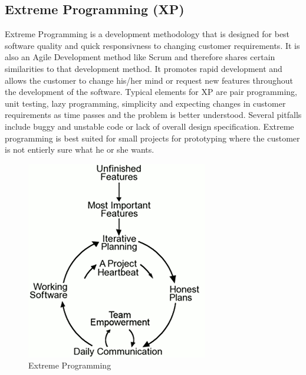 \subsection{Extreme Programming (XP)}
Extreme Programming is a development methodology that is designed for best software quality and
quick responsivness to changing customer requirements. It is also an Agile Development method like
Scrum and therefore shares certain similarities to that development method. It promotes rapid
development and allows the customer to change his/her mind or request new features throughout
the development of the software. Typical elements for XP are pair programming, unit testing,
lazy programming, simplicity and expecting changes in customer requirements as time passes
and the problem is better understood. Several pitfalls include buggy and unstable code or lack of
overall design specification. Extreme programming is best suited for small projects for prototyping
where the customer is not entierly sure what he or she wants.
\begin{figure}[h!]
\centering \includegraphics[scale=0.75]{img/designmodel-xp} \caption{Extreme Programming\cite{link:xp}}
\label{fig:desigmodel-xp}
\end{figure}

